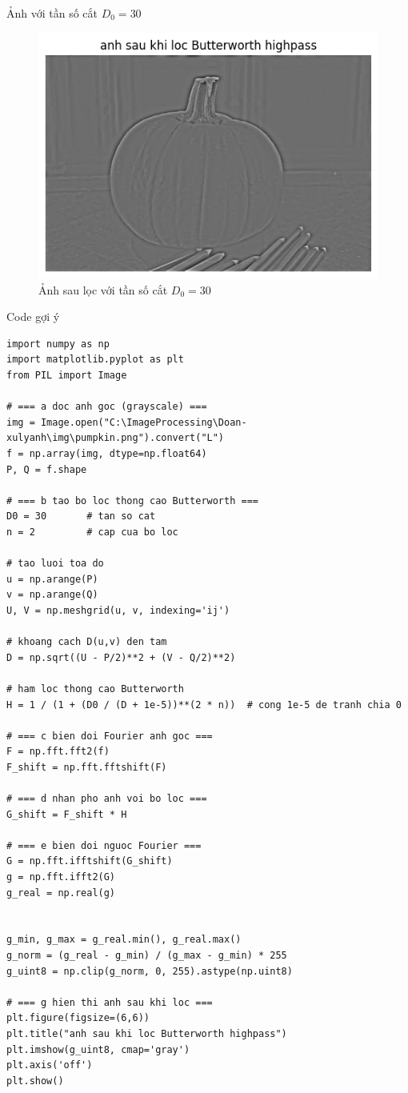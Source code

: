 \documentclass[12pt,a4paper]{report}
\numberwithin{equation}{section}
\theoremstyle{definition} %
\begin{document}
Ảnh với tần số cắt $D_0=30$
\begin{figure}[H]
\centering
\includegraphics[width=0.7\linewidth]{img/butterworthhighpass/anhsaulocHighpass.png}
\caption{Ảnh sau lọc với tần số cắt $D_0=30$}
\end{figure}
Code gợi ý
\begin{lstlisting}
import numpy as np
import matplotlib.pyplot as plt
from PIL import Image

# === a doc anh goc (grayscale) ===
img = Image.open("C:\ImageProcessing\Doan-xulyanh\img\pumpkin.png").convert("L")
f = np.array(img, dtype=np.float64)
P, Q = f.shape

# === b tao bo loc thong cao Butterworth ===
D0 = 30       # tan so cat
n = 2         # cap cua bo loc

# tao luoi toa do
u = np.arange(P)
v = np.arange(Q)
U, V = np.meshgrid(u, v, indexing='ij')

# khoang cach D(u,v) den tam
D = np.sqrt((U - P/2)**2 + (V - Q/2)**2)

# ham loc thong cao Butterworth
H = 1 / (1 + (D0 / (D + 1e-5))**(2 * n))  # cong 1e-5 de tranh chia 0

# === c bien doi Fourier anh goc ===
F = np.fft.fft2(f)
F_shift = np.fft.fftshift(F)

# === d nhan pho anh voi bo loc ===
G_shift = F_shift * H

# === e bien doi nguoc Fourier ===
G = np.fft.ifftshift(G_shift)
g = np.fft.ifft2(G)
g_real = np.real(g)


g_min, g_max = g_real.min(), g_real.max()
g_norm = (g_real - g_min) / (g_max - g_min) * 255
g_uint8 = np.clip(g_norm, 0, 255).astype(np.uint8)

# === g hien thi anh sau khi loc ===
plt.figure(figsize=(6,6))
plt.title("anh sau khi loc Butterworth highpass")
plt.imshow(g_uint8, cmap='gray')
plt.axis('off')
plt.show()

\end{lstlisting}
\end{document}
